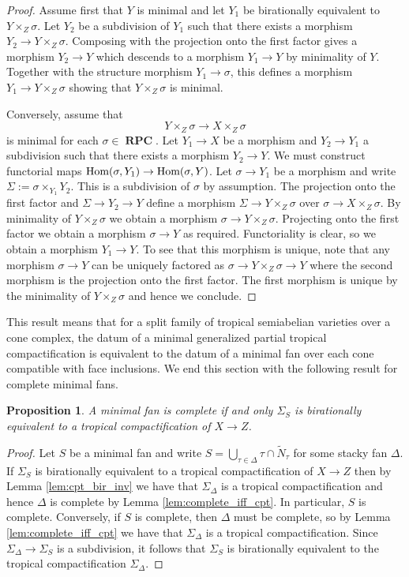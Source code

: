\documentclass[11pt]{amsart}
\newtheorem{proposition}[theorem]{Proposition}
\theoremstyle{definition}
\theoremstyle{remark}
\DeclareMathOperator{\RPC}{\mathbf{RPC}}
\DeclareMathOperator{\Hom}{\textup{Hom}}
\begin{document}
\begin{proof}
	Assume first that $Y$ is minimal and let $Y_1$ be birationally equivalent to $Y\times_Z \sigma$. Let $Y_2$ be
	a subdivision of $Y_1$ such that there exists a morphism $Y_2\to Y\times_Z \sigma$. Composing with the projection
	onto the first factor gives a morphism $Y_2\to Y$ which descends to a morphism $Y_1\to Y$ by minimality of $Y$.
	Together with the structure morphism $Y_1\to \sigma$, this defines a morphism $Y_1\to Y\times_Z \sigma$ showing
	that $Y\times_Z \sigma$ is minimal.

	Conversely, assume that
	$$Y\times_Z\sigma\to X\times_Z \sigma$$
	is minimal for each $\sigma\in \RPC$. Let
	$Y_1\to X$ be a morphism and $Y_2\to Y_1$ a subdivision such that there exists a morphism
	$Y_2\to Y$. We must construct functorial maps $\Hom(\sigma,Y_1)\to \Hom(\sigma,Y)$. Let $\sigma\to Y_1$
	be a morphism and write $\Sigma:=\sigma\times_{Y_1}Y_2$. This is a subdivision of $\sigma$ by assumption.
	The projection onto the first factor and $\Sigma\to Y_2\to Y$ define a morphism $\Sigma\to Y\times_{Z}\sigma$
	over $\sigma\to X\times_Z \sigma$. By minimality of $Y\times_Z\sigma$ we obtain a morphism $\sigma\to Y\times_Z \sigma$.
	Projecting onto the first factor we obtain a morphism $\sigma\to Y$ as required. Functoriality is clear,
	so we obtain a morphism $Y_1\to Y$. To see that this morphism is unique, note that any morphism $\sigma\to Y$
	can be uniquely factored as $\sigma\to Y\times_Z \sigma\to Y$ where the second morphism is the projection onto
	the first factor. The first morphism is unique by the minimality of $Y\times_Z \sigma$ and hence we conclude.
\end{proof}

This result means that for a split family of tropical semiabelian varieties over a cone complex, the datum of a minimal
generalized partial tropical compactification is equivalent to the datum of a minimal fan over each cone compatible with face inclusions.
We end this section with the following result for complete minimal fans.

\begin{proposition}
	\label{prop:complete_iff_bir_to_cpt}
	A minimal fan is complete if and only $\Sigma_S$ is birationally equivalent to a tropical compactification of $X\to Z$.
\end{proposition}

\begin{proof}
	Let $S$ be a minimal fan and write $S=\bigcup_{\tau\in \Delta}\tau\cap \tilde{N}_{\tau}$ for some stacky
	fan $\Delta$. If $\Sigma_S$ is birationally equivalent to a tropical compactification of $X\to Z$ then
	by Lemma \ref{lem:cpt_bir_inv} we have that $\Sigma_{\Delta}$ is a tropical compactification and hence $\Delta$
	is complete by Lemma \ref{lem:complete_iff_cpt}. In particular, $S$ is complete. Conversely, if $S$
	is complete, then $\Delta$ must be complete, so by Lemma \ref{lem:complete_iff_cpt} we have that
	$\Sigma_{\Delta}$ is a tropical compactification. Since
	$\Sigma_{\Delta}\to \Sigma_{S}$ is a subdivision, it follows
	that $\Sigma_S$ is birationally equivalent to the tropical
	compactification $\Sigma_{\Delta}$.
\end{proof}
\end{document}
